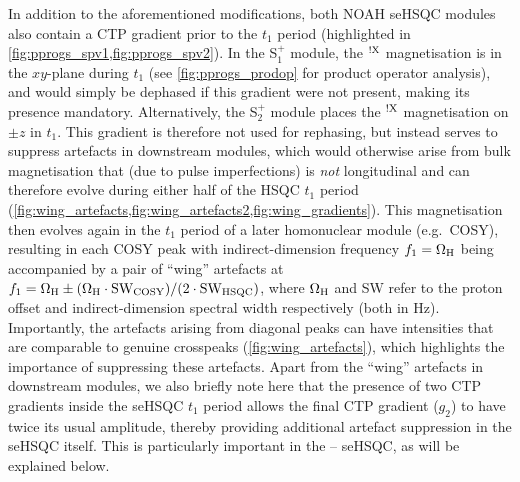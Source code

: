 \documentclass[11pt]{article}
\newcommand*{\noahSpa}{S$^+_1$}
\newcommand*{\noahSpb}{S$^+_2$}
\newcommand*{\proton}{\ce{^{1}H}}
\newcommand*{\nitrogen}{\ce{^{15}N}}
\newcommand*{\magnnot}[1]{\ce{^1H}$^{!#1}$}
\begin{document}
In addition to the aforementioned modifications, both NOAH seHSQC modules also contain a CTP gradient prior to the $t_1$ period (highlighted in \cref{fig:pprogs_spv1,fig:pprogs_spv2}).
In the \noahSpa{} module, the \magnnot{\ce{X}} magnetisation is in the $xy$-plane during $t_1$ (see \cref{fig:pprogs_prodop} for product operator analysis), and would simply be dephased if this gradient were not present, making its presence mandatory.
Alternatively, the \noahSpb{} module places the \magnnot{\ce{X}} magnetisation on $\pm z$ in $t_1$.
This gradient is therefore not used for rephasing, but instead serves to suppress artefacts in downstream modules, which would otherwise arise from bulk magnetisation that (due to pulse imperfections) is \textit{not} longitudinal and can therefore evolve during either half of the HSQC $t_1$ period (\cref{fig:wing_artefacts,fig:wing_artefacts2,fig:wing_gradients}).
This magnetisation then evolves again in the $t_1$ period of a later homonuclear module (e.g.\ COSY), resulting in each COSY peak with indirect-dimension frequency $f_1 = \Omega_{\ce{H}}$ being accompanied by a pair of ``wing'' artefacts at $f_1 = \Omega_{\ce{H}} \pm (\Omega_{\ce{H}}\cdot\mathrm{SW_{COSY}})/(2\cdot \mathrm{SW_{HSQC}})$, where $\Omega_{\ce{H}}$ and SW refer to the proton offset and indirect-dimension spectral width respectively (both in Hz).
Importantly, the artefacts arising from diagonal peaks can have intensities that are comparable to genuine crosspeaks (\cref{fig:wing_artefacts}), which highlights the importance of suppressing these artefacts.
Apart from the ``wing'' artefacts in downstream modules, we also briefly note here that the presence of two CTP gradients inside the seHSQC $t_1$ period allows the final CTP gradient ($g_2$) to have twice its usual amplitude, thereby providing additional artefact suppression in the seHSQC itself.
This is particularly important in the \nitrogen{}--\proton{} seHSQC, as will be explained below.
\end{document}
